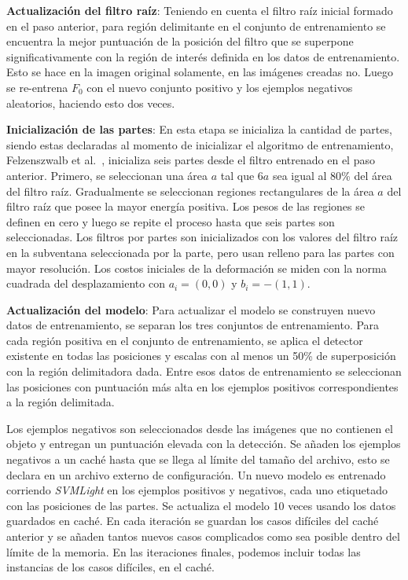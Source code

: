 \textbf{Actualización del filtro raíz}:
Teniendo en cuenta el filtro raíz inicial formado en el paso anterior, para región delimitante en el conjunto de entrenamiento se encuentra la mejor puntuación de la posición del filtro que se superpone significativamente con la región de interés definida en los datos de entrenamiento. Esto se hace en la imagen original solamente, en las imágenes creadas no. Luego se re-entrena $F_0$ con el nuevo conjunto positivo y los ejemplos negativos aleatorios, haciendo esto dos veces.

\textbf{Inicialización de las partes}:
En esta etapa se inicializa la cantidad de partes, siendo estas declaradas al momento de inicializar el algoritmo de entrenamiento, Felzenszwalb et al.~\cite{Felzenszwalb2008}, inicializa seis partes desde el filtro entrenado en el paso anterior. Primero, se seleccionan una área $a$ tal que $6a$ sea igual al 80\% del área del filtro raíz. Gradualmente se seleccionan regiones rectangulares de la área $a$ del filtro raíz que posee la mayor energía positiva. Los pesos de las regiones se definen en cero y luego se repite el proceso hasta que seis partes son seleccionadas. Los filtros por partes son inicializados con los valores del filtro raíz en la subventana seleccionada por la parte, pero usan relleno para las partes con mayor resolución. Los costos iniciales de la deformación se miden con la norma cuadrada del desplazamiento con $a_i=(0, 0)$ y $b_i=-(1, 1)$.

\textbf{Actualización del modelo}:
Para actualizar el modelo se construyen nuevo datos de entrenamiento, se separan los tres conjuntos de entrenamiento. Para cada región positiva en el conjunto de entrenamiento, se aplica el detector existente en todas las posiciones y escalas con al menos un 50\% de superposición con la región delimitadora dada. Entre esos datos de entrenamiento se seleccionan las posiciones con puntuación más alta en los ejemplos positivos correspondientes a la región delimitada.

Los ejemplos negativos son seleccionados desde las imágenes que no contienen el objeto y entregan un puntuación elevada con la detección. Se añaden los ejemplos negativos a un caché hasta que se llega al límite del tamaño del archivo, esto se declara en un archivo externo de configuración. Un nuevo modelo es entrenado corriendo \textit{SVMLight} en los ejemplos positivos y negativos, cada uno etiquetado con las posiciones de las partes. Se actualiza el modelo 10 veces usando los datos guardados en caché. En cada iteración se guardan los casos difíciles del caché anterior y se añaden tantos nuevos casos complicados como sea posible dentro del límite de la memoria. En las iteraciones finales, podemos incluir todas las instancias de los casos difíciles, en el caché.

